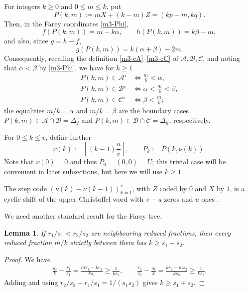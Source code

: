 \documentclass[11pt,reqno,tbtags,a4paper]{amsart}
\numberwithin{equation}{section}
\renewcommand\le{\leq}
\renewcommand\ge{\geq}
\renewcommand\leq{\leqslant}
\renewcommand\geq{\geqslant}
\theoremstyle{plain}%
\newtheorem{lemma}[theorem]{Lemma}
\theoremstyle{definition}
\theoremstyle{remark}
\newcounter{cases}
\newcommand\inter{\ensuremath{^\circ}}
\newcommand\ga{\alpha}
\newcommand\gb{\beta}
\newcommand\gD{\Delta}
\newcommand\cA{\mathcal A}
\newcommand\cB{\mathcal B}
\newcommand\cC{\mathcal C}
\newcommand\0{{\boldsymbol 0}}
\newcommand\1{{\boldsymbol 1}}
\begin{document}
For integers $k\ge0$ and $0\le m\le k$, put
\begin{equation}\label{m3-Pkm}
        P(k,m):=mX+(k-m)Z=(kp-m,kq).
\end{equation}
Then, in the Farey coordinates \eqref{m3-Phi},
\begin{equation}\label{m3-Pkm-sector}
        f(P(k,m))=m-k\alpha,
        \qquad
        h(P(k,m))=k\beta-m,
\end{equation}
and also, since $g=h-f$,
\begin{equation}\label{m3-Pkm-g}
        g(P(k,m))=k(\ga+\beta)-2m.
\end{equation}
Consequently,
recalling the definition \eqref{m3-cA}--\eqref{m3-cC} of $\cA,\cB,\cC$, 
%
and noting that $\ga<\gb$ by \eqref{m3-Phi}, we have
for $k\ge1$
\begin{align}
  P(k,m)\in\cA\inter &\iff  \frac{m}k < \ga, \label{qaA}
\\
  P(k,m)\in\cB\inter &\iff  \ga <\frac{m}k < \gb,\label{qaB}
\\
  P(k,m)\in\cC\inter &\iff  \gb <\frac{m}k;\label{qaC}
\end{align}
the equalities $m/k=\alpha$ and $m/k=\beta$ are the
boundary cases $P(k,m)\in\cA\cap\cB = \gD_f$
and $P(k,m)\in\cB\cap\cC = \gD_h$, respectively.

For $0\le k\le v$, define further
\begin{equation}\label{m3-nu-Pk}
        \nu(k):=\left\lceil (k-1)\frac uv\right\rceil,
        \qquad
        P_k:=P(k,\nu(k)).
\end{equation}
Note that $\nu(0)=0$ and thus $P_0=(0,0)=U$; this trivial case will be
convenient in later subsections, but here we will use $k\ge1$.

The step code $(\nu(k)-\nu(k-1))_{k=1}^v$, with $Z$ coded by $0$
and $X$ by $1$, is a cyclic shift of the upper Christoffel word with
$v-u$ zeros and $u$ ones \cite{BLRS09}.

We need another standard result for the Farey tree.
\begin{lemma}\label{Lm3-no-small}
If $r_1/s_1<r_2/s_2$ are neighbouring reduced fractions, then every reduced
fraction $m/k$ strictly between them has $k\ge s_1+s_2$.
\end{lemma}

\begin{proof}
We have
\begin{align}
        \frac{m}{k}-\frac{r_1}{s_1}
=\frac{ms_1-kr_1}{ks_1}
\ge\frac1{ks_1},
        \qquad
        \frac{r_2}{s_2}-\frac{m}{k}
=\frac{kr_2-ms_2}{ks_2}
\ge\frac1{ks_2}.
\end{align}
Adding and using
$r_2/s_2-r_1/s_1=1/(s_1s_2)$ gives $k\ge s_1+s_2$.
\end{proof}
\end{document}
